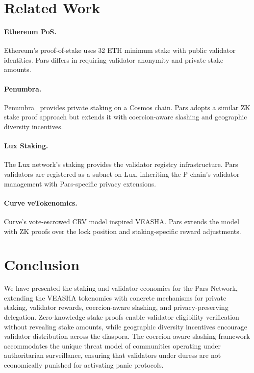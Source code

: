 \documentclass[11pt,a4paper]{article}
\begin{document}
\section{Related Work}
\label{sec:related}

\paragraph{Ethereum PoS.}  Ethereum's proof-of-stake uses 32 ETH minimum
stake with public validator identities.  Pars differs in requiring
validator anonymity and private stake amounts.

\paragraph{Penumbra.}  Penumbra~\cite{penumbra2023} provides private
staking on a Cosmos chain.  Pars adopts a similar ZK stake proof
approach but extends it with coercion-aware slashing and geographic
diversity incentives.

\paragraph{Lux Staking.}  The Lux network's staking provides the
validator registry infrastructure.  Pars validators are registered as
a subnet on Lux, inheriting the P-chain's validator management with
Pars-specific privacy extensions.

\paragraph{Curve veTokenomics.}  Curve's vote-escrowed CRV model
inspired VEASHA.  Pars extends the model with ZK proofs over the lock
position and staking-specific reward adjustments.

\section{Conclusion}
\label{sec:conclusion}

We have presented the staking and validator economics for the Pars
Network, extending the VEASHA tokenomics with concrete mechanisms for
private staking, validator rewards, coercion-aware slashing, and
privacy-preserving delegation.  Zero-knowledge stake proofs enable
validator eligibility verification without revealing stake amounts,
while geographic diversity incentives encourage validator distribution
across the diaspora.  The coercion-aware slashing framework
accommodates the unique threat model of communities operating under
authoritarian surveillance, ensuring that validators under duress are
not economically punished for activating panic protocols.
\end{document}
